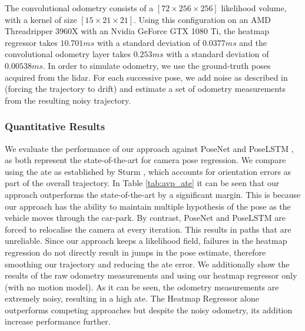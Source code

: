 \documentclass[letterpaper, 10 pt, conference]{ieeeconf}  %
\begin{document}
The convolutional odometry consists of a \ensuremath{[72 \times 256 \times 256]} likelihood volume, with a kernel of size \ensuremath{[15 \times 21 \times 21]}.
Using this configuration on an AMD Threadripper 3960X with an Nvidia GeForce GTX 1080 Ti, the heatmap regressor takes \ensuremath{10.701ms} with a standard deviation of \ensuremath{0.0377ms} and the convolutional odometry layer takes \ensuremath{0.253 ms} with a standard deviation of \ensuremath{0.00538 ms}.
In order to simulate odometry, we use the ground-truth poses acquired from the \ac{lidar}. 
For each successive pose, we add noise as described in \cite{Thrun2006rm} (forcing the trajectory to drift) and estimate a set of odometry measurements from the resulting noisy trajectory.

\subsubsection{Quantitative Results} 
We evaluate the performance of our approach against PoseNet \cite{kendall2017geometric} and PoseLSTM \cite{Walch17}, as both represent the state-of-the-art for camera pose regression. 
We compare using the \ac{ate} as established by Sturm \etal \cite{Sturm2012}, which accounts for orientation errors as part of the overall trajectory. 
In Table \ref{tab:avp_ate} it can be seen that our approach outperforms the state-of-the-art by a significant margin. 
This is because our approach has the ability to maintain multiple hypothesis of the pose as the vehicle moves through the car-park. 
By contrast, PoseNet and PoseLSTM are forced to relocalise the camera at every iteration. 
This results in paths that are unreliable. 
Since our approach keeps a likelihood field, failures in the heatmap regression do not directly result in jumps in the pose estimate, therefore smoothing our trajectory and reducing the \ac{ate} error. 
We additionally show the results of the raw odometry measurements and using our heatmap regressor only (with no motion model). 
As it can be seen, the odometry measurements are extremely noisy, resulting in a high \ac{ate}.
The Heatmap Regressor alone outperforms competing approaches but despite the noisy odometry, its addition increase performance further.
\end{document}
